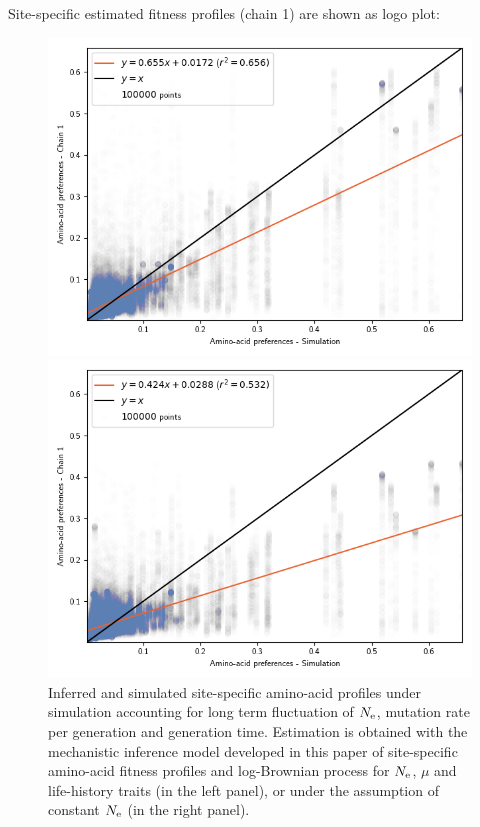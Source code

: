 \documentclass{article}
\begin{document}
	Site-specific estimated fitness profiles (chain 1) are shown as logo plot:
	
	

	\begin{figure}[H]
		\centering
		\begin{minipage}{0.49\linewidth}
			\includegraphics[width=\linewidth, page=1]{simulations/BranchWise_SimuDiv_SiteMutSelBranchNe_ProfileCorrelation.png}
		\end{minipage} \hfill
		\begin{minipage}{0.49\linewidth}
			\includegraphics[width=\linewidth, page=1]{simulations/BranchWise_SimuDiv_SiteMutSel_ProfileCorrelation.png}
		\end{minipage}
		\caption[Inferred site amino-acid profiles for \texttt{SimuDiv}]{
		Inferred and simulated site-specific amino-acid profiles under simulation accounting for long term fluctuation of $N_{\text{e}}$, mutation rate per generation and generation time.
		Estimation is obtained with the mechanistic inference model developed in this paper of site-specific amino-acid fitness profiles and log-Brownian process for $N_{\text{e}}$, $\mu$ and life-history traits (in the left panel), or under the assumption of constant $N_{\text{e}}$ (in the right panel).
		}
	\end{figure}
\end{document}
